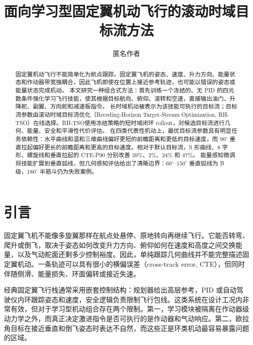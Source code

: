 \documentclass{article}
\title{面向学习型固定翼机动飞行的滚动时域目标流方法}
\author{匿名作者}
\newcommand{\rhtso}{RH-TSO}
\begin{document}
\maketitle


\begin{abstract}
固定翼机动飞行不能简单化为航点跟踪。固定翼飞机的姿态、速度、升力方向、能量状态和作动器带宽强耦合，因此飞机即使在位置上接近参考轨迹，也可能以错误的姿态或能量状态完成机动。
本文研究一种组合式方法：首先训练一个冻结的、无 PID 的四元数条件强化学习飞行技能，使其根据目标航向、俯仰、滚转和空速，直接输出油门、升降舵、副翼、方向舵和减速板指令。
长时域机动被表示为该技能可执行的目标流；目标流参数由滚动时域目标流优化（Receding-Horizon Target-Stream Optimization, \rhtso）在线选择。\rhtso 使用冻结策略的短时域闭环 rollout，对候选目标流进行几何、能量、安全和平滑性代价评估。
在四类代表性机动上，最优目标流参数具有明显任务依赖性：水平曲线和温和三维曲线偏好更短的前瞻距离和更低的目标速度，而 $90^\circ$ 垂直拉起偏好更长的前瞻距离和更高的目标速度。相对于默认目标流，S 形曲线、8 字形、螺旋线和垂直拉起的 CTE-P90 分别改善 39\%、2\%、24\% 和 47\%。
能量感知微调将技能扩展到垂直弧线，但几何感知评估给出了清晰边界：$60^\circ$--$150^\circ$ 垂直弧线为 B 级，$180^\circ$ 半筋斗仍为失败案例。
\end{abstract}



\section{引言}

固定翼飞机不能像多旋翼那样在航点处悬停、原地转向再继续飞行。它能否转弯、爬升或倒飞，取决于姿态如何改变升力方向、俯仰如何在速度和高度之间交换能量，以及气动舵面还剩多少控制裕度。因此，单纯跟踪几何曲线并不能完整描述固定翼机动。一条轨迹可以具有很小的横偏误差（cross-track error, CTE），但同时伴随侧滑、能量损失、环面偏转或接近失速。

经典固定翼飞行栈通常采用嵌套控制结构：规划器给出高层参考，PID 或自动驾驶仪内环跟踪姿态和速度，安全逻辑负责限制飞行包线。这类系统在设计工况内非常有效，但对于学习型机动组合存在两个限制。第一，学习模块被隔离在作动器级动力学之外，而真正决定激进指令是否可执行的是作动器和气动响应。第二，欧拉角目标在接近垂直和倒飞姿态时表达不自然，而这些正是环类机动最容易暴露问题的区域。
\end{document}
